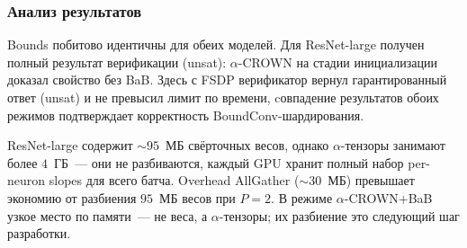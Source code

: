 \subsubsection{Анализ результатов}

Bounds побитово идентичны для обеих моделей.
Для ResNet-large получен полный результат верификации (unsat):
$\alpha$-CROWN на стадии инициализации доказал свойство без BaB.
Здесь с FSDP верификатор вернул
гарантированный ответ (unsat) и не превысил лимит по времени,
cовпадение результатов обоих режимов подтверждает корректность
BoundConv-шардирования.

ResNet-large содержит $\sim\!95$~МБ свёрточных весов, однако
$\alpha$-тензоры занимают более $4$~ГБ~--- они не разбиваются,
каждый GPU хранит полный набор per-neuron slopes для всего батча.
Overhead AllGather ($\sim\!30$~МБ) превышает экономию от
разбиения $95$~МБ весов при $P=2$.
В режиме $\alpha$-CROWN+BaB узкое место по памяти~--- не веса,
а $\alpha$-тензоры; их разбиение это следующий шаг разработки.

